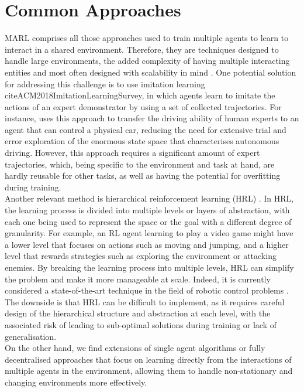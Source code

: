 \documentclass[a4paper,singleside,12pt]{report} %
\begin{document}
\section{Common Approaches}\label{common-approaches}
MARL comprises all those approaches used to train multiple agents to learn to interact in a shared environment. Therefore, they are techniques designed to handle large environments, the added complexity of having multiple interacting entities and most often designed with scalability in mind \cite{Gronauer2021MultiagentDR, HernandezLeal2019ASA, Stone2022ASO}. One potential solution for addressing this challenge is to use imitation learning cite{ACM2018ImitationLearningSurvey}, in which agents learn to imitate the actions of an expert demonstrator by using a set of collected trajectories. For instance, \cite{Osinski2019SimulationBasedRL, Maramotti2022TacklingRA} uses this approach to transfer the driving ability of human experts to an agent that can control a physical car, reducing the need for extensive trial and error exploration of the enormous state space that characterises autonomous driving. However, this approach requires a significant amount of expert trajectories, which, being specific to the environment and task at hand, are hardly reusable for other tasks, as well as having the potential for overfitting during training.\\
Another relevant method is hierarchical reinforcement learning (HRL) \cite{MLKE2022HRLSurvey}. In HRL, the learning process is divided into multiple levels or layers of abstraction, with each one being used to represent the space or the goal with a different degree of granularity. For example, an RL agent learning to play a video game might have a lower level that focuses on actions such as moving and jumping, and a higher level that rewards strategies such as exploring the environment or attacking enemies. By breaking the learning process into multiple levels, HRL can simplify the problem and make it more manageable at scale. Indeed, it is currently considered a state-of-the-art technique in the field of robotic control problems \cite{Nachum2018DataEfficientHR}. The downside is that HRL can be difficult to implement, as it requires careful design of the hierarchical structure and abstraction at each level, with the associated risk of leading to sub-optimal solutions during training or lack of generalisation.\\
On the other hand, we find extensions of single agent algorithms or fully decentralised approaches that focus on learning directly from the interactions of multiple agents in the environment, allowing them to handle non-stationary and changing environments more effectively.
\end{document}
